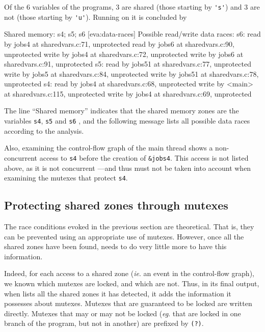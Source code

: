 \documentclass{frama-c-book}
\def\eg.{\emph{eg}.}
\def\ie.{\emph{ie}.}
\begin{document}
Of the 6 variables of the programs, 3 are shared (those starting by \verb+'s'+)
and 3 are not (those starting by \verb+'u'+).
Running \mthread on it is concluded by
%
\begin{logs}
 Shared memory: s4; s5; s6
[eva:data-races]
  Possible read/write data races:
    s6:
      read by jobs4 at sharedvars.c:71, unprotected
      read by jobs6 at sharedvars.c:90, unprotected
      write by jobs4 at sharedvars.c:72, unprotected
      write by jobs6 at sharedvars.c:91, unprotected
    s5:
      read by jobs51 at sharedvars.c:77, unprotected
      write by jobs5 at sharedvars.c:84, unprotected
      write by jobs51 at sharedvars.c:78, unprotected
    s4:
      read by jobs4 at sharedvars.c:68, unprotected
      write by <main> at sharedvars.c:115, unprotected
      write by jobs4 at sharedvars.c:69, unprotected
\end{logs}
The line ``Shared memory'' indicates that the
shared memory zones are the variables \verb+s4+,
\verb+s5+ and \verb+s6+ , and the following message lists
all possible data races according to the analysis.

Also, examining the control-flow graph of the main thread shows a
non-concurrent access to \verb+s4+ before the creation of
\verb+&jobs4+.  This access is not listed above, as it is not
concurrent ---and thus must not be taken into account when examining
the mutexes that protect \verb+s4+.

\subsection{Protecting shared zones through mutexes}

The race conditions evoked in the previous section are theoretical.
That is, they can be prevented using an appropriate use of mutexes.
However, once all the shared zones have been found, \mthread needs
to do very little more to have this information.

Indeed, for each access to a shared zone (\ie. an event in the
control-flow graph), we known which mutexes are locked, and which are
not. Thus, in its final output, when \mthread lists all the shared
zones it has detected, it adds the information it possesses about
mutexes. Mutexes that are guaranteed to be locked are written
directly.  Mutexes that may or may not be locked (\eg. that are locked
in one branch of the program, but not in another) are prefixed by
\verb+(?)+.
\end{document}

